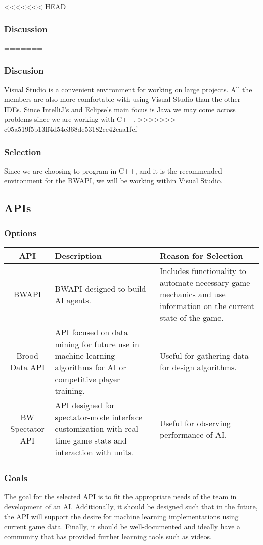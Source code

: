 \documentclass[10pt,letterpaper,onecolumn,draftclsnofoot]{IEEEtran}
\begin{document}
<<<<<<< HEAD
\subsubsection{Discussion}
=======
\subsubsection{Discusion}
Visual Studio is a convenient environment for working on large projects. All the members are also more comfortable with using Visual Studio than the other IDEs. Since IntelliJ's and Eclipse's main focus is Java we may come across problems since we are working with C++.
>>>>>>> c05a519f5b13ff4d54c368de53182ce42eaa1fef

\subsubsection{Selection}
Since we are choosing to program in C++, and it is the recommended environment for the BWAPI, we will be working within Visual Studio.

\subsection{APIs}
\subsubsection{Options}
\begin{center}
	\begin{tabular}{ ||C|L|L|| } 
		\hline
		API & Description & Reason for Selection \\
		\hline
		BWAPI & BWAPI designed to build AI agents. & Includes functionality to automate necessary game mechanics and use information on the current state of the game. \\ 
		\hline
		Brood Data API & API focused on data mining for future use in machine-learning algorithms for AI or competitive player training. & Useful for gathering data for design algorithms.\\ 
		\hline
		 BW Spectator API & API designed for spectator-mode interface customization with real-time game stats and interaction with units. & Useful for observing performance of AI. \\ 
		\hline
	\end{tabular}
\end{center}
\subsubsection{Goals}
	The goal for the selected API is to fit the appropriate needs of the team in development of an AI. Additionally, it should be designed such that in the future, the API will support the desire for machine learning implementations using current game data. Finally, it should be well-documented and ideally have a community that has provided further learning tools such as videos.
\end{document}
